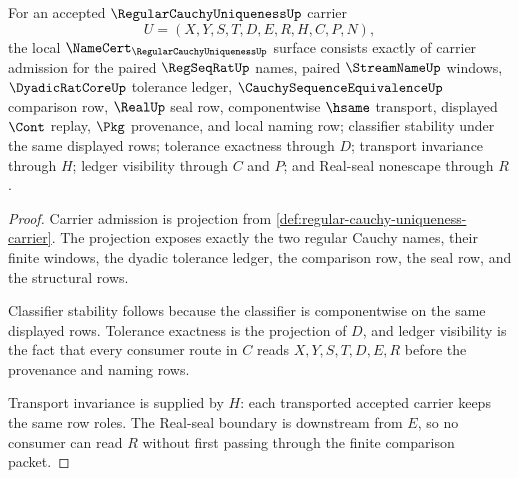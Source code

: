 \begin{theorem}
\label{thm:regular-cauchy-uniqueness-namecert-obligations}
For an accepted $\RegularCauchyUniquenessUp$ carrier
$$
U=(X,Y,S,T,D,E,R,H,C,P,N),
$$
the local $\NameCert_{\RegularCauchyUniquenessUp}$ surface consists exactly of carrier admission for the paired $\RegSeqRatUp$ names, paired $\StreamNameUp$ windows, $\DyadicRatCoreUp$ tolerance ledger, $\CauchySequenceEquivalenceUp$ comparison row, $\RealUp$ seal row, componentwise $\hsame$ transport, displayed $\Cont$ replay, $\Pkg$ provenance, and local naming row; classifier stability under the same displayed rows; tolerance exactness through $D$; transport invariance through $H$; ledger visibility through $C$ and $P$; and Real-seal nonescape through $R$.
\end{theorem}
\begin{proof}
Carrier admission is projection from \autoref{def:regular-cauchy-uniqueness-carrier}. The projection exposes exactly the two regular Cauchy names, their finite windows, the dyadic tolerance ledger, the comparison row, the seal row, and the structural rows.

Classifier stability follows because the classifier is componentwise on the same displayed rows. Tolerance exactness is the projection of $D$, and ledger visibility is the fact that every consumer route in $C$ reads $X,Y,S,T,D,E,R$ before the provenance and naming rows.

Transport invariance is supplied by $H$: each transported accepted carrier keeps the same row roles. The Real-seal boundary is downstream from $E$, so no consumer can read $R$ without first passing through the finite comparison packet.
\end{proof}

